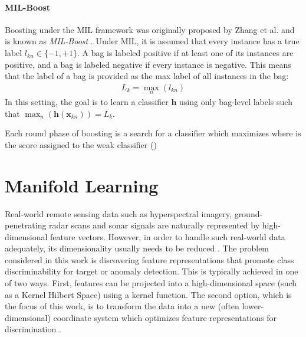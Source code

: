 \paragraph{MIL-Boost}
Boosting under the MIL framework was originally proposed by Zhang et al. and is known as \textit{MIL-Boost} \citep{Zhang2006MIBoosting}.  Under MIL, it is assumed that every instance has a true label $l_{kn} \in \{ -1,+1 \}$.  A bag is labeled positive if at least one of its instances are positive, and a bag is labeled negative if every instance is negative.  This means that the label of a bag is provided as the max label of all instances in the bag:
\begin{align}
	L_{k} = \max_{n}(l_{kn})
\end{align}
\noindent
In this setting, the goal is to learn a classifier $\bm{h}$ using only bag-level labels such that $\max_{n}(\bm{h}(\bm{x}_{kn})) = L_{k}$.

Each round phase of boosting is a search for a classifier which maximizes  where  is the score assigned to the weak classifier ()


\section{Manifold Learning}

Real-world remote sensing data such as hyperspectral imagery, ground-penetrating radar scans and sonar signals are naturally represented by high-dimensional feature vectors.  However, in order to handle such real-world data adequately, its dimensionality usually needs to be reduced \citep{VanDerMaaten2009DRReview,Belkin2004SemiSupLearningRiemannianManifolds}. The problem considered in this work is discovering feature representations that promote class discriminability for target or anomaly detection.  This is typically achieved in one of two ways.  First, features can be projected into a high-dimensional space (such as a Kernel Hilbert Space) using a kernel function. The second option, which is the focus of this work, is to transform the data into a new (often lower-dimensional) coordinate system which optimizes feature representations for discrimination \citep{Vural2018StudySupervisedManifoldLearning}.


